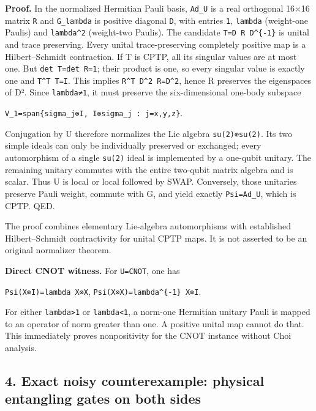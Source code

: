 \documentclass[
  10pt,
  a4paper,
]{article}
\begin{document}
\textbf{Proof.} In the normalized Hermitian Pauli basis, \texttt{Ad\_U} is a real orthogonal 16×16 matrix \texttt{R} and \texttt{G\_lambda} is positive diagonal \texttt{D}, with entries \texttt{1}, \texttt{lambda} (weight-one Paulis) and \texttt{lambda\^{}2} (weight-two Paulis). The candidate \texttt{T=D\ R\ D\^{}\{-1\}} is unital and trace preserving. Every unital trace-preserving completely positive map is a Hilbert--Schmidt contraction. If T is CPTP, all its singular values are at most one. But \texttt{\textbar{}det\ T\textbar{}=\textbar{}det\ R\textbar{}=1}; their product is one, so every singular value is exactly one and \texttt{T\^{}T\ T=I}. This implies \texttt{R\^{}T\ D\^{}2\ R=D\^{}2}, hence R preserves the eigenspaces of D². Since \texttt{lambda≠1}, it must preserve the six-dimensional one-body subspace

\texttt{V\_1=span\{sigma\_j⊗I,\ I⊗sigma\_j\ :\ j=x,y,z\}}.

Conjugation by U therefore normalizes the Lie algebra \texttt{su(2)⊕su(2)}. Its two simple ideals can only be individually preserved or exchanged; every automorphism of a single \texttt{su(2)} ideal is implemented by a one-qubit unitary. The remaining unitary commutes with the entire two-qubit matrix algebra and is scalar. Thus U is local or local followed by SWAP. Conversely, those unitaries preserve Pauli weight, commute with G, and yield exactly \texttt{Psi=Ad\_U}, which is CPTP. QED.

The proof combines elementary Lie-algebra automorphisms with established Hilbert--Schmidt contractivity for unital CPTP maps. It is not asserted to be an original normalizer theorem.

\textbf{Direct CNOT witness.} For \texttt{U=CNOT}, one has

\texttt{Psi(X⊗I)=lambda\ X⊗X}, \texttt{Psi(X⊗X)=lambda\^{}\{-1\}\ X⊗I}.

For either \texttt{lambda\textgreater{}1} or \texttt{lambda\textless{}1}, a norm-one Hermitian unitary Pauli is mapped to an operator of norm greater than one. A positive unital map cannot do that. This immediately proves nonpositivity for the CNOT instance without Choi analysis.

\subsection{4. Exact noisy counterexample: physical entangling gates on both sides}\label{exact-noisy-counterexample-physical-entangling-gates-on-both-sides}
\end{document}
